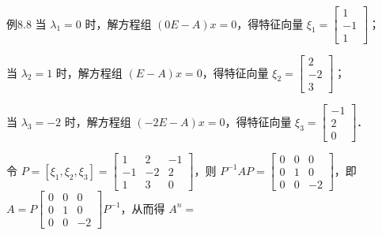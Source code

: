 \begin{fcard}{例8.8}
当 $\lambda_1=0$ 时，解方程组 $(0E-A)x=0$，得特征向量 $\xi_1=\begin{bmatrix}1\\-1\\1\end{bmatrix}$；

当 $\lambda_2=1$ 时，解方程组 $(E-A)x=0$，得特征向量 $\xi_2=\begin{bmatrix}2\\-2\\3\end{bmatrix}$；

当 $\lambda_3=-2$ 时，解方程组 $(-2E-A)x=0$，得特征向量 $\xi_3=\begin{bmatrix}-1\\2\\0\end{bmatrix}$．

令 $P=[\xi_1,\xi_2,\xi_3]=\begin{bmatrix}1&2&-1\\-1&-2&2\\1&3&0\end{bmatrix}$，则 $P^{-1}AP=\begin{bmatrix}0&0&0\\0&1&0\\0&0&-2\end{bmatrix}$，即 $A=P\begin{bmatrix}0&0&0\\0&1&0\\0&0&-2\end{bmatrix}P^{-1}$，从而得 $A^n=$




\end{fcard}
